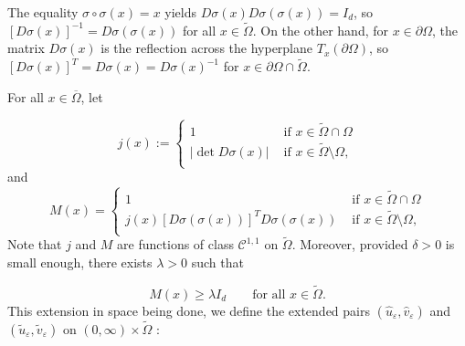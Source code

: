 \documentclass[reqno,12pt,twoside]{amsart}
\numberwithin{equation}{section} \numberwithin{theorem}{section}
\numberwithin{proposition}{section} \numberwithin{lemma}{section}
\numberwithin{corollary}{section}
\numberwithin{definition}{section} \numberwithin{remark}{section}
\begin{document}
The equality $\sigma \circ \sigma (x) = x$ yields $D\sigma (x) D\sigma (\sigma (x)) = I_d$, so $[D\sigma (x)]^{-1} = D\sigma (\sigma (x))$ for all $x\in \widetilde{\Omega}$.   
On the other hand, for $x\in \partial\Omega$, the matrix $D\sigma (x)$ is the reflection across the hyperplane $T_x (\partial \Omega)$, so $[D\sigma (x)]^T =  D\sigma (x) = D\sigma (x)^{-1}$ for $x\in \partial\Omega \cap \widetilde{\Omega}$. 

\smallskip

For all $x\in \overline{\Omega}$, let 

\[j(x) := \left\{ \begin{array}{ll}
1 & \text{ if } x\in \widetilde{\Omega} \cap \Omega \\
|\det D \sigma (x) | & \text{ if } x\in \widetilde{\Omega} \setminus \Omega,\\
\end{array} \right.\]
and 
\[M(x) = \left\{ \begin{array}{ll}
1 & \text{ if } x\in \widetilde{\Omega} \cap \Omega \\
j(x) [D\sigma (\sigma (x))]^T D\sigma (\sigma (x)) & \text{ if } x\in \widetilde{\Omega} \setminus \Omega,\\
\end{array}\right.\]
Note that $j$ and $M$ are functions of class $\mathcal{C}^{1,1}$ on $\widetilde{\Omega}$. Moreover, provided $\delta >0$ is small enough, there exists $\lambda >0$ such that 

\begin{equation}\label{hypA}
M(x) \geqslant \lambda I_d \quad \quad \text{for all } x\in \widetilde{\Omega}.
\end{equation}
This extension in space being done, we define the extended pairs $(\hat{u}_\varepsilon , \hat{v}_\varepsilon) $ and $(\widetilde{u}_\varepsilon , \widetilde{v}_\varepsilon )$ on $(0,\infty)\times \widetilde{\Omega}$ : 
\end{document}
